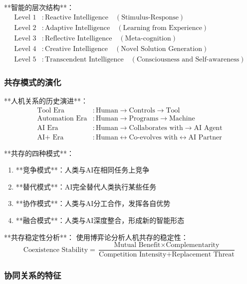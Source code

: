 **智能的层次结构**：
\begin{align}
\text{Level 1} &: \text{Reactive Intelligence} \quad (\text{Stimulus-Response}) \\
\text{Level 2} &: \text{Adaptive Intelligence} \quad (\text{Learning from Experience}) \\
\text{Level 3} &: \text{Reflective Intelligence} \quad (\text{Meta-cognition}) \\
\text{Level 4} &: \text{Creative Intelligence} \quad (\text{Novel Solution Generation}) \\
\text{Level 5} &: \text{Transcendent Intelligence} \quad (\text{Consciousness and Self-awareness})
\end{align}

\subsubsection{共存模式的演化} %

**人机关系的历史演进**：
\begin{align}
\text{Tool Era} &: \text{Human} \rightarrow \text{Controls} \rightarrow \text{Tool} \\
\text{Automation Era} &: \text{Human} \rightarrow \text{Programs} \rightarrow \text{Machine} \\
\text{AI Era} &: \text{Human} \rightarrow \text{Collaborates with} \rightarrow \text{AI Agent} \\
\text{AI+ Era} &: \text{Human} \leftrightarrow \text{Co-evolves with} \leftrightarrow \text{AI Partner}
\end{align}

**共存的四种模式**：
\begin{enumerate}
\item **竞争模式**：人类与AI在相同任务上竞争
\item **替代模式**：AI完全替代人类执行某些任务
\item **协作模式**：人类与AI分工合作，发挥各自优势
\item **融合模式**：人类与AI深度整合，形成新的智能形态
\end{enumerate}

**共存稳定性分析**：
使用博弈论分析人机共存的稳定性：
\begin{equation}
\text{Coexistence Stability} = \frac{\text{Mutual Benefit} \times \text{Complementarity}}{\text{Competition Intensity} + \text{Replacement Threat}}
\end{equation}

\subsubsection{协同关系的特征} %

